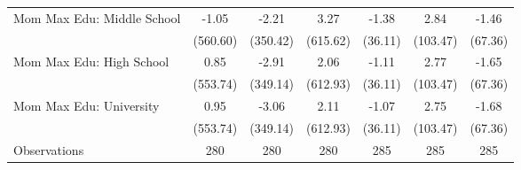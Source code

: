 {\begin{tabular}{l*{6}{c}}
\addlinespace
Mom Max Edu: Middle School&       -1.05         &       -2.21         &        3.27         &       -1.38         &        2.84         &       -1.46         \\
                    &    (560.60)         &    (350.42)         &    (615.62)         &     (36.11)         &    (103.47)         &     (67.36)         \\
\addlinespace
Mom Max Edu: High School&        0.85         &       -2.91         &        2.06         &       -1.11         &        2.77         &       -1.65         \\
                    &    (553.74)         &    (349.14)         &    (612.93)         &     (36.11)         &    (103.47)         &     (67.36)         \\
\addlinespace
Mom Max Edu: University&        0.95         &       -3.06         &        2.11         &       -1.07         &        2.75         &       -1.68         \\
                    &    (553.74)         &    (349.14)         &    (612.93)         &     (36.11)         &    (103.47)         &     (67.36)         \\
\midrule
Observations        &         280         &         280         &         280         &         285         &         285         &         285         \\
\bottomrule
\end{tabular}
}
